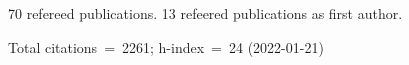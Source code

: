 70 refereed publications. 13 refeered publications as first author.

Total citations~=~2261; h-index~=~24 (2022-01-21)